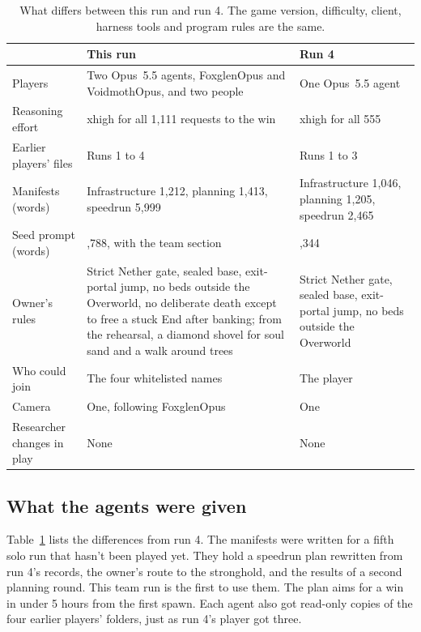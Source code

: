 \documentclass[11pt,a4paper]{article}
\begin{document}
\begin{table}[t]
  \caption{What differs between this run and run 4. The game version, difficulty, client, harness tools and program rules are the same.}
  \label{tab:setup}
  \footnotesize
  \begin{tabularx}{\textwidth}{@{}>{\raggedright\arraybackslash}p{2.6cm}>{\raggedright\arraybackslash}X>{\raggedright\arraybackslash}X@{}}
    \toprule
    & \textbf{This run} & \textbf{Run 4} \\
    \midrule
    Players & Two Opus~5.5 agents, FoxglenOpus and VoidmothOpus, and two people & One Opus~5.5 agent \\
    Reasoning effort & xhigh for all 1,111 requests to the win & xhigh for all 555 \\
    Earlier players' files & Runs 1 to 4 & Runs 1 to 3 \\
    Manifests (words) & Infrastructure 1,212, planning 1,413, speedrun 5,999 & Infrastructure 1,046, planning 1,205, speedrun 2,465 \\
    Seed prompt (words) & 1,788, with the team section & 1,344 \\
    Owner's rules & Strict Nether gate, sealed base, exit-portal jump, no beds outside the Overworld, no deliberate death except to free a stuck End after banking; from the rehearsal, a diamond shovel for soul sand and a walk around trees & Strict Nether gate, sealed base, exit-portal jump, no beds outside the Overworld \\
    Who could join & The four whitelisted names & The player \\
    Camera & One, following FoxglenOpus & One \\
    Researcher changes in play & None & None \\
    \bottomrule
  \end{tabularx}
\end{table}

\subsection{What the agents were given}

Table~\ref{tab:setup} lists the differences from run 4. The manifests were written for a fifth solo run that hasn't been played yet. They hold a speedrun plan rewritten from run 4's records, the owner's route to the stronghold, and the results of a second planning round. This team run is the first to use them. The plan aims for a win in under 5 hours from the first spawn. Each agent also got read-only copies of the four earlier players' folders, just as run 4's player got three.
\end{document}
